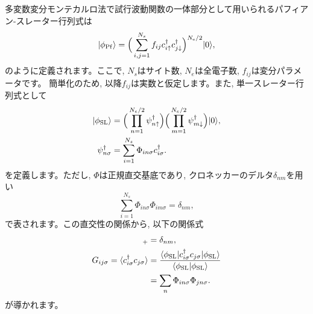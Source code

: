 多変数変分モンテカルロ法で試行波動関数の一体部分として用いられるパフィアン-スレーター行列式は
\begin{equation}
|\phi_{\rm Pf}\rangle=\Big(\sum_{i,j=1}^{N_{s}}f_{ij}c_{i\uparrow}^{\dagger}c_{j\downarrow}^{\dagger}\Big)^{N_{\rm e}/2}|0\rangle,
\end{equation}
のように定義されます。ここで, $N_{s}$はサイト数, $N_{e}$は全電子数, $f_{ij}$は変分パラメータです。
簡単化のため, 以降$f_{ij}$は実数と仮定します。また, 単一スレーター行列式として
\begin{align}
|\phi_{\rm SL}\rangle&=\Big(\prod_{n=1}^{N_{e}/2}\psi_{n\uparrow}^{\dagger}\Big)
\Big(\prod_{m=1}^{N_{e}/2}\psi_{m\downarrow}^{\dagger}\Big)|0\rangle, \\
\psi_{n\sigma}^{\dagger}&=\sum_{i=1}^{N_{s}}\Phi_{in\sigma}c^{\dagger}_{i\sigma}.
\end{align}
を定義します。ただし, $\Phi$は正規直交基底であり, クロネッカーのデルタ$\delta_{nm}$を用い
\begin{equation}
\sum_{i=1}^{N_{s}}\Phi_{in\sigma}\Phi_{im\sigma}=\delta_{nm},
\end{equation}
で表されます。この直交性の関係から, 以下の関係式
\begin{align}
[\psi^{\dagger}_{n\sigma},\psi_{m\sigma}]_{+}&=\delta_{nm},\\
G_{ij\sigma}=\langle c_{i\sigma}^{\dagger}c_{j\sigma}\rangle 
&=\frac{\langle \phi_{\rm SL}| c_{i\sigma}^{\dagger}c_{j\sigma} | \phi_{\rm SL}\rangle}{\langle \phi_{\rm SL}|\phi_{\rm SL}\rangle } \\
&=\sum_{n} \Phi_{in\sigma} \Phi_{jn\sigma}.
\end{align}
が導かれます。

